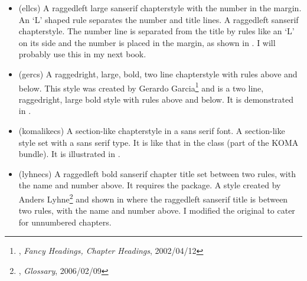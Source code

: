 \begin{itemize}


\item[\cstyle{ell}] 
\glossary(ellcs)%
  {}%
  {A raggedleft large sanserif chapterstyle with the number in the margin. An
   `L' shaped rule separates the number and title lines.}
  A raggedleft sanserif chapterstyle. 
  The number line is separated
  from the title by rules like an `L' on its side and the number is placed
  in the margin, as shown in . 
I will probably use this in my next book. 


\item[\cstyle{ger}] 
\glossary(gercs)%
  {}%
  {A raggedright, large, bold, two line chapterstyle with rules
   above and below.}
This style was created by 
Gerardo Garcia\footnote{\ctt,
  \textit{Fancy Headings, Chapter Headings}, 2002/04/12} and is a two line,
  raggedright, large bold style with rules above and below. It is
  demonstrated in .


\item[\cstyle{komalike}] 
\glossary(komalikecs)%
  {}%
  { A section-like chapterstyle in a sans serif font.}
A section-like style set with a sans serif type. It is like that in the
 class (part of the KOMA bundle). 
It is illustrated in 
.



\item[\cstyle{lyhne}] 
\glossary(lyhnecs)%
  {}%
  {A raggedleft bold sanserif chapter title set between two rules, with the
   name and number above. It requires the  package.}
  A style created by Anders
  Lyhne\footnote{\ctt, \textit{Glossary}, 2006/02/09} and shown in 
  where the raggedleft
  sanserif title is between two rules, with the name and number above.
  I modified the original to cater for unnumbered chapters. 


\end{itemize}
